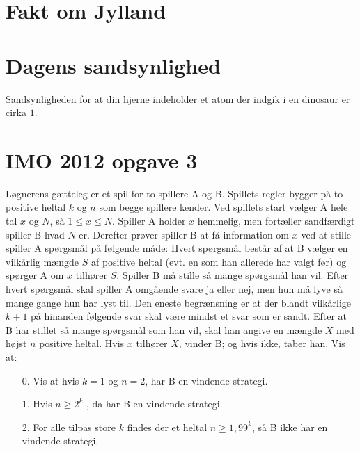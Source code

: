 \documentclass[article,10pt,a4,oneside]{memoir}
\begin{document}
\begin{minipage}[b]{0.95\textwidth}
\begin{minipage}[t]{0.47\textwidth}
\vspace{1mm}
\section*{Fakt om Jylland}


\section*{Dagens sandsynlighed}
Sandsynligheden for at din hjerne indeholder et atom der indgik i en dinosaur er cirka $1$.

\section*{IMO 2012 opgave 3}
Løgnerens gætteleg er et spil for to spillere A og B. Spillets regler bygger på to positive
heltal $k$ og $n$ som begge spillere kender. Ved spillets start vælger A hele tal $x$ og $N$, så $1 \le x \le N$. Spiller A holder $x$ hemmelig, men fortæller sandfærdigt spiller B hvad $N$ er. Derefter prøver spiller B at få information om $x$ ved at stille spiller A spørgsmål på følgende måde: Hvert spørgsmål består af at B vælger en vilkårlig mængde $S$ af positive heltal (evt. en som han allerede har valgt før) og spørger A om $x$ tilhører $S$. Spiller B må stille så mange spørgsmål han vil. Efter hvert spørgsmål skal spiller A omgående svare ja eller nej, men hun må lyve så mange gange hun har lyst til. Den eneste begrænsning er at der blandt vilkårlige $k + 1$ på hinanden følgende svar skal være mindst et svar som er sandt. Efter at B har stillet så mange spørgsmål som han vil, skal han angive en mængde $X$ med højst $n$ positive heltal. Hvis $x$ tilhører $X$, vinder B; og hvis ikke, taber han. Vis at:
\begin{enumerate}
\item[0.] Vis at hvis $k=1$ og $n=2$, har B en vindende strategi.
\item[1.] Hvis $n \ge 2^k$ , da har B en vindende strategi.
\item[2.] For alle tilpas store $k$ findes der et heltal $n \ge 1,99^k$, så B ikke har en vindende strategi.
\end{enumerate}

\end{minipage}%
\hfill\begin{minipage}[t]{0.47\textwidth}
\vspace{1mm}

\end{minipage}
\end{minipage}
\end{document}
